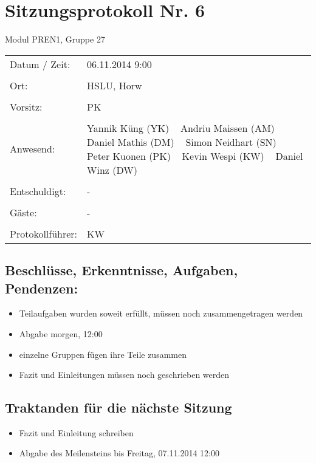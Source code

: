 \documentclass[a4paper,10pt,fleqn]{article}
\begin{document}
\section*{Sitzungsprotokoll Nr. 6}
Modul PREN1, Gruppe 27

\begin{longtable}[l]{@{}p{}@{}p{}@{}}
    Datum / Zeit: &
        06.11.2014 9:00
        \\\\
    Ort: &
        HSLU, Horw
        \\\\
    Vorsitz: &
        PK
        \\\\
    Anwesend: &
        Yannik Küng (YK) ~
        Andriu Maissen (AM) ~
        Daniel Mathis (DM) ~
        Simon Neidhart (SN) ~
        Peter Kuonen (PK) ~
        Kevin Wespi (KW) ~
        Daniel Winz (DW) ~
        \\\\
    Entschuldigt: &
        - ~
        \\\\
    Gäste: &
        - ~
        \\\\
    Protokollführer: &
        KW
        \\
\end{longtable}
%
\subsection*{Beschlüsse, Erkenntnisse, Aufgaben, Pendenzen:}
\begin{itemize}
    \item Teilaufgaben wurden soweit erfüllt, müssen noch zusammengetragen werden
    \item Abgabe morgen, 12:00
    \item einzelne Gruppen fügen ihre Teile zusammen
    \item Fazit und Einleitungen müssen noch geschrieben werden
\end{itemize}
%
\subsection*{Traktanden für die nächste Sitzung}
\begin{itemize}
	\item Fazit und Einleitung schreiben
    \item Abgabe des Meilensteins bis Freitag, 07.11.2014 12:00
\end{itemize}
%
\end{document}
